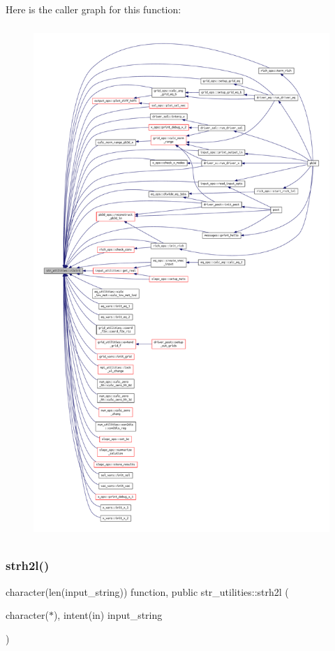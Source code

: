 Here is the caller graph for this function\+:
\nopagebreak
\begin{figure}[H]
\begin{center}
\leavevmode
\includegraphics[height=550pt]{namespacestr__utilities_ac778d706b2e021672618939ab58fdd32_icgraph}
\end{center}
\end{figure}
\mbox{\label{namespacestr__utilities_a219964a283968cc6a968db0197d2187e}} 
\subsubsection{\texorpdfstring{strh2l()}{strh2l()}}
{\footnotesize\ttfamily character(len(input\+\_\+string)) function, public str\+\_\+utilities\+::strh2l (\begin{DoxyParamCaption}\item[{character($\ast$), intent(in)}]{input\+\_\+string }\end{DoxyParamCaption})}




